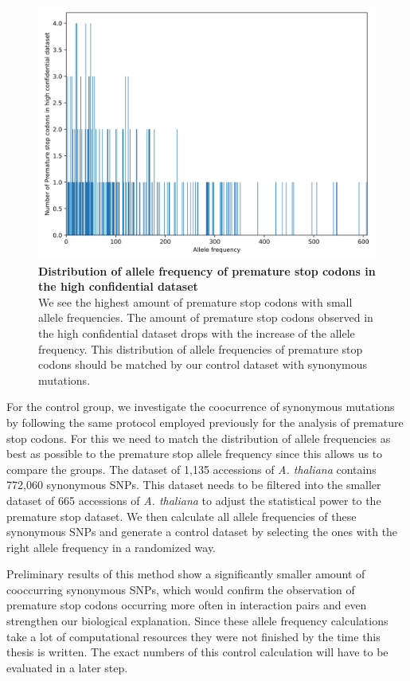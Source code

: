 \begin{figure}[tb]
  \centering
  \begin{minipage}[h]{0.9\textwidth}
    \centering
    \includegraphics[width=1.0\textwidth]{images/Allele_Frequency.png}
    \caption[Distribution of allele frequency of premature stop codons in the high confidential dataset]{\textbf{Distribution of allele frequency of premature stop codons in the high confidential dataset}\\
    We see the highest amount of premature stop codons with small allele frequencies. The amount of premature stop codons observed in the high confidential dataset drops with the increase of the allele frequency. This distribution of allele frequencies of premature stop codons should be matched by our control dataset with synonymous mutations.
    }
   \label{fig:Allele_Frequency}
  \end{minipage}
\end{figure} 

For the control group, we investigate the coocurrence of synonymous mutations by following the same protocol employed previously for the analysis of premature stop codons. For this we need to match the distribution of allele frequencies as best as possible to the premature stop allele frequency since this allows us to compare the groups. The dataset of 1,135 accessions of \textit{A. thaliana} contains 772,060 synonymous SNPs. This dataset needs to be filtered into the smaller dataset of 665 accessions of \textit{A. thaliana} to adjust the statistical power to the premature stop dataset. We then calculate all allele frequencies of these synonymous SNPs and generate a control dataset by selecting the ones with the right allele frequency in a randomized way. 

Preliminary results of this method show a significantly smaller amount of cooccurring synonymous SNPs, which would confirm the observation of premature stop codons occurring more often in interaction pairs  and even strengthen our biological explanation. Since these allele frequency calculations take a lot of computational resources they were not finished by the time this thesis is written. The exact numbers of this control calculation will have to be evaluated in a later step. 